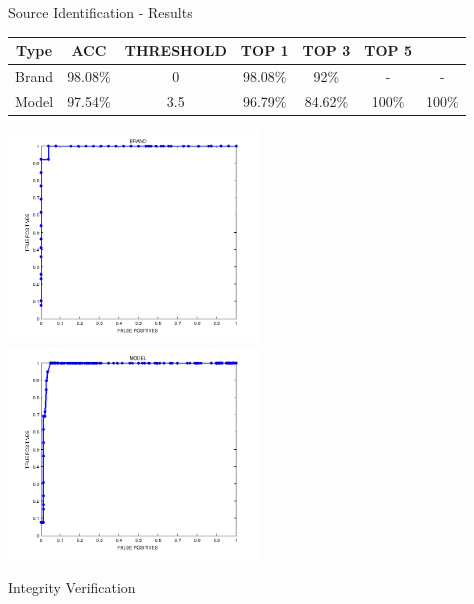 \begin{tframe}{Source Identification - Results}

\begin{footnotesize}
\begin{table}[h!]
\centering
\begin{tabular}{c c c c c c c} 
\hline \hline 
\textbf{Type} & \textbf{ACC} & \textbf{THRESHOLD} & \textbf{TOP 1} & \textbf{TOP 3} & \textbf{TOP 5}\\ [0.5ex]
\hline

Brand & 98.08\% & 0 & 98.08\% & 92\% & - & - \\
Model & 97.54\% & 3.5 & 96.79\% & 84.62\% & 100\% & 100\% \\

\hline
\end{tabular}
\end{table}
\end{footnotesize}

\vspace{0.1cm}
    
\includegraphics[width=0.5\textwidth]{images/brand-plot-label.png}
\includegraphics[width=0.5\textwidth]{images/model-plot-label.png}

\end{tframe}

\begin{tframe}{Integrity Verification}

\vspace{0.2cm}







\end{tframe}

